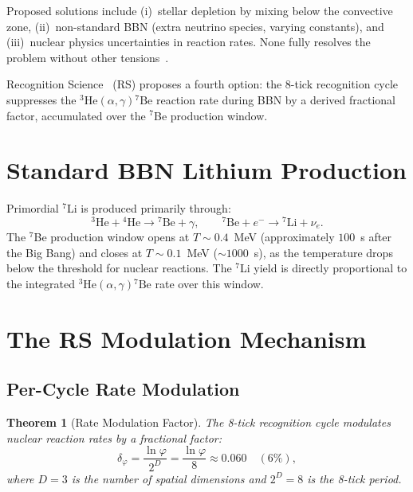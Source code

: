 \documentclass[12pt,a4paper]{article}
\newtheorem{theorem}{Theorem}[section]
\theoremstyle{definition}
\theoremstyle{remark}
\begin{document}
Proposed solutions include (i)~stellar depletion by mixing below the
convective zone, (ii)~non-standard BBN (extra neutrino species, varying
constants), and (iii)~nuclear physics uncertainties in reaction rates.
None fully resolves the problem without other tensions~\cite{Fields2011}.

Recognition Science~\cite{RS_Axioms} (RS) proposes a fourth option: the 8-tick recognition cycle suppresses
the ${}^3\mathrm{He}(\alpha,\gamma){}^7\mathrm{Be}$ reaction rate
during BBN by a derived fractional factor, accumulated over the
${}^7$Be production window.

\section{Standard BBN Lithium Production}
\label{sec:standard}

Primordial $^7$Li is produced primarily through:
\begin{equation}
  {}^3\mathrm{He} + {}^4\mathrm{He} \to {}^7\mathrm{Be} + \gamma,
  \qquad
  {}^7\mathrm{Be} + e^- \to {}^7\mathrm{Li} + \nu_e.
\end{equation}
The $^7$Be production window opens at $T \sim 0.4$~MeV (approximately
$100$~s after the Big Bang) and closes at $T \sim 0.1$~MeV
($\sim 1000$~s), as the temperature drops below the threshold for
nuclear reactions.  The $^7$Li yield is directly proportional to the
integrated ${}^3\mathrm{He}(\alpha,\gamma){}^7\mathrm{Be}$ rate over
this window.

\section{The RS Modulation Mechanism}
\label{sec:mechanism}

\subsection{Per-Cycle Rate Modulation}

\begin{theorem}[Rate Modulation Factor]
\label{thm:rate}
The 8-tick recognition cycle modulates nuclear reaction rates by a
fractional factor:
\begin{equation}
  \delta_\varphi = \frac{\ln\varphi}{2^D}
  = \frac{\ln\varphi}{8} \approx 0.060 \quad (6\%),
\end{equation}
where $D = 3$ is the number of spatial dimensions and $2^D = 8$ is
the 8-tick period.
\end{theorem}
\end{document}
